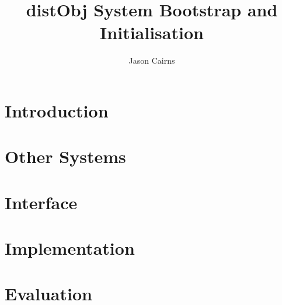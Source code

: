 \documentclass[a4paper,10pt]{article}
\begin{document}
\title{distObj System Bootstrap and Initialisation}
\author{Jason Cairns}
  
\maketitle{}

\section{Introduction}

\section{Other Systems}

\section{Interface}

\section{Implementation}

\section{Evaluation}
\end{document}
